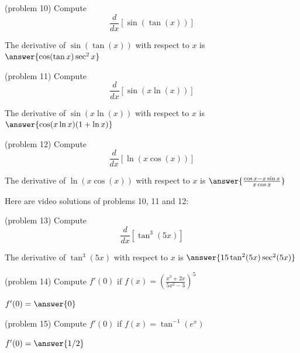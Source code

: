 \documentclass{ximera}
\begin{document}
\begin{problem}(problem 10)
  Compute
  \[
  \frac{d}{dx} \left[\sin(\tan (x))\right]
  \]
  
    
		The derivative of $\sin(\tan (x))$ with respect to $x$ is
		 $\answer{\cos(\tan x)\sec^2 x}$
		
\end{problem}



\begin{problem}(problem 11)
  Compute
  \[
  \frac{d}{dx} \left[\sin(x\ln (x))\right]
  \]
  
    
		The derivative of $\sin(x\ln (x))$ with respect to $x$ is
		 $\answer{\cos(x\ln x)(1+\ln x)}$
		
\end{problem}



\begin{problem}(problem 12)
  Compute
  \[
  \frac{d}{dx} \left[\ln(x\cos (x))\right]
  \]
  
    
		The derivative of $\ln(x\cos (x))$ with respect to $x$ is
		 $\answer{\frac{\cos x - x\sin x}{x\cos x}}$
		
\end{problem}

Here are video solutions of problems 10, 11 and 12:
\begin{foldable}
\end{foldable}

\begin{problem}(problem 13)
  Compute
  \[
  \frac{d}{dx} \left[\tan^3(5x)\right]
  \]
  
   
		The derivative of $\tan^3(5x)$ with respect to $x$ is
		 $\answer{15\tan^2(5x)\sec^2(5x)}$
		
\end{problem}



\begin{problem}(problem 14)
  Compute $f'(0)$ if $\displaystyle
  f(x) = \left(\frac{x^3 + 2x}{5x^2 -3}\right)^5
  $
  
 
		 $f'(0) = \answer{0}$
		
\end{problem}



\begin{problem}(problem 15)
  Compute $f'(0)$ if  $\displaystyle f(x)=\tan^{-1}(e^x)$
  
  
 
		 $f'(0) = \answer{1/2}$
		
\end{problem}
\end{document}
